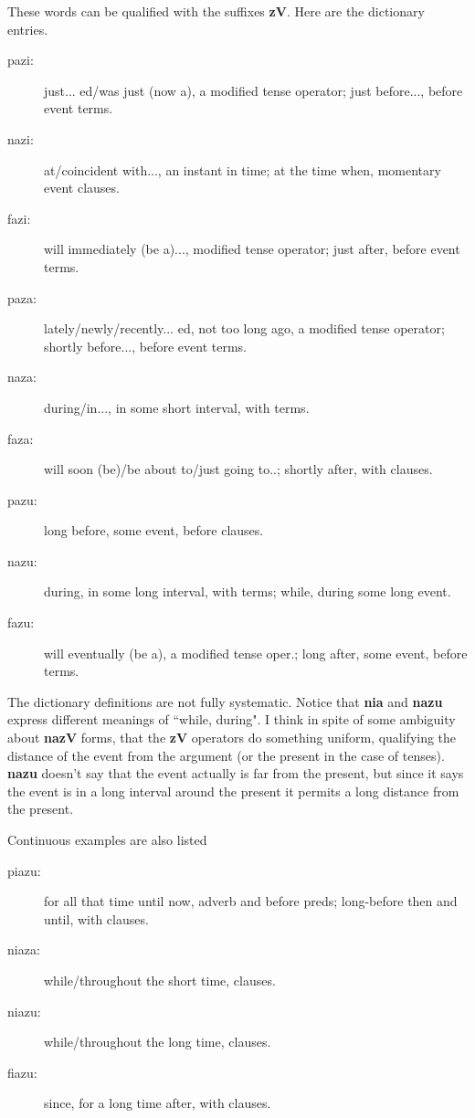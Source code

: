 \documentclass[12pt]{book}
\begin{document}
These words can be qualified with the suffixes {\bf zV}.   Here are the dictionary entries.

\begin{description}

\item[pazi:]  just... ed/was just (now a), a modified tense operator;  just before..., before event terms.

\item[nazi:]  at/coincident with..., an instant in time;  at the time when, momentary event clauses.

\item[fazi:]  will immediately (be a)..., modified tense operator;  just after, before event terms.

\item[paza:]  lately/newly/recently... ed, not too long ago, a modified tense operator; shortly before..., before event terms.

\item[naza:]  during/in..., in some short interval, with terms.

\item[faza:]   will soon (be)/be about to/just going to..;  shortly after, with clauses.

\item[pazu:]  long before, some event, before clauses.

\item[nazu:]  during, in some long interval, with terms; while, during some long event.

\item[fazu:]  will eventually (be a), a modified tense oper.;  long after, some event, before terms.


\end{description}


The dictionary definitions are not fully systematic.   Notice that {\bf nia} and {\bf nazu} express different meanings of ``while, during".    I think in spite of some ambiguity about
{\bf nazV} forms, that the {\bf zV} operators do something uniform, qualifying the distance of the event from the argument (or the present in the case of tenses).   {\bf nazu}
doesn't say that the event actually is far from the present, but since it says the event is in a long interval around the present it permits a long distance from the present.

Continuous examples are also listed


\begin{description}

\item[piazu:]  for all that time until now, adverb and before preds; long-before then and until, with clauses.

\item[niaza:]  while/throughout the short time, clauses.

\item[niazu:]  while/throughout the long time, clauses.

\item[fiazu:]  since, for a long time after, with clauses.


\end{description}
\end{document}
